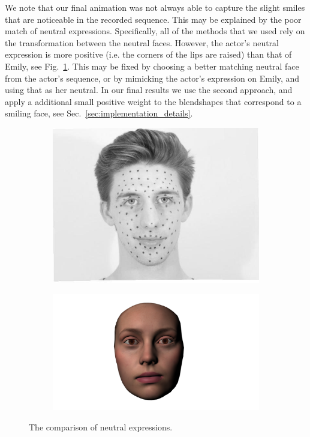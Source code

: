 \documentclass[11pt]{report}
\begin{document}
We note that our final animation was not always able to capture the slight smiles that are noticeable in the recorded sequence. This may be explained by the poor match of neutral expressions. Specifically, all of the methods that we used rely on the transformation between the neutral faces. However, the actor's neutral expression is more positive (i.e. the corners of the lips are raised) than that of Emily, see Fig.~\ref{fig:neutrals}. This may be fixed by choosing a better matching neutral face from the actor's sequence, or by mimicking the actor's expression on Emily, and using that as her neutral. In our final results we use the second approach, and apply a additional small positive weight to the blendshapes that correspond to a smiling face, see Sec.~\ref{sec:implementation_details}.
\begin{figure}
        \centering
        \begin{subfigure}[b]{0.3\textwidth}
                \includegraphics[width=\textwidth]{img/Richard2neutral}
        \end{subfigure}
        \begin{subfigure}[b]{0.4\textwidth}
                \includegraphics[width=\textwidth]{img/emily_neutral}
        \end{subfigure}
        \caption{The comparison of neutral expressions.}\label{fig:neutrals}
\end{figure}
\end{document}
